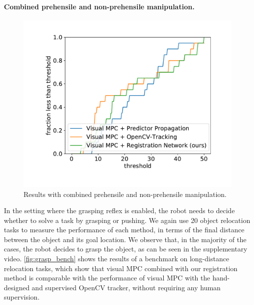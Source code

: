 
\vspace{-0.1in}
\paragraph{Combined prehensile and non-prehensile manipulation.}

\begin{figure}
\vspace{-0.3in}
\centering
\hspace{-0.57cm}\includegraphics[width=0.39\columnwidth]{images/grasping_score_cdf.pdf}
\vspace{-0.9cm}
\caption{\small Results with combined prehensile and non-prehensile manipulation.}
\label{fig:grasp_bench}
\vspace{-0.3in}
\end{figure}

In the setting where the grasping reflex is enabled, the robot needs to decide whether to solve a task by grasping or pushing. We again use 20 object relocation tasks to measure the performance of each method, in terms of the final distance between the object and its goal location. We observe that, in the majority of the cases, the robot decides to grasp the object, as can be seen in the supplementary video. \autoref{fig:grasp_bench} shows the results of a benchmark on long-distance relocation tasks, which show that visual MPC combined with our registration method is comparable with the performance of visual MPC with the hand-designed and supervised OpenCV tracker, without requiring any human supervision.
